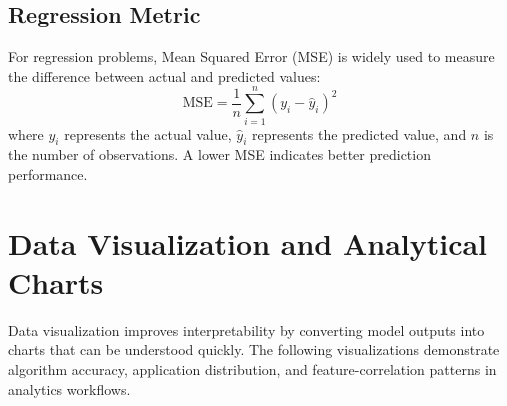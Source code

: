 \documentclass[11pt,a4paper]{article}
\begin{document}
\subsection{Regression Metric}

For regression problems, Mean Squared Error (MSE) is widely used to measure the difference between actual and predicted values:
\[
\text{MSE}=\frac{1}{n}\sum_{i=1}^{n}(y_i-\hat{y}_i)^2
\]
where $y_i$ represents the actual value, $\hat{y}_i$ represents the predicted value, and $n$ is the number of observations. A lower MSE indicates better prediction performance.



\section{Data Visualization and Analytical Charts}

Data visualization improves interpretability by converting model outputs into charts that can be understood quickly. The following visualizations demonstrate algorithm accuracy, application distribution, and feature-correlation patterns in analytics workflows.
\end{document}

